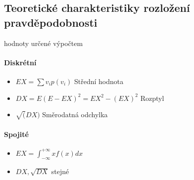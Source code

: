 \documentclass[a4paper, 11pt]{report}
\begin{document}
\subsection{Teoretické charakteristiky rozložení pravděpodobnosti}

hodnoty určené výpočtem

\paragraph{Diskrétní}
\begin{itemize}
	\item $EX = \sum v_i p(v_i)$ Střední hodnota
	\item $DX = E(E-EX)^2 = EX^2 - (EX)^2$ Rozptyl
	\item $\sqrt(DX)$ Směrodatná odchylka
\end{itemize}

\paragraph{Spojité}
\begin{itemize}
	\item $EX = \int_{-\infty}^{+\infty} x f(x) dx$
	\item $DX, \sqrt{DX}$ stejné
\end{itemize}
\end{document}
